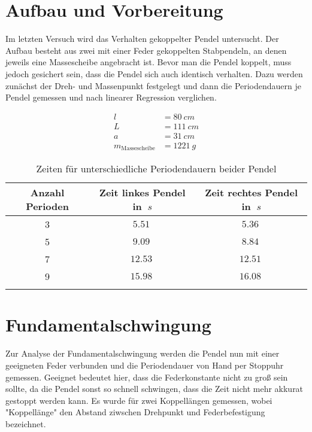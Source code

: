 \section{Aufbau und Vorbereitung}

Im letzten Versuch wird das Verhalten gekoppelter Pendel untersucht. Der Aufbau besteht aus zwei mit einer Feder gekoppelten Stabpendeln, an denen jeweils eine Massescheibe angebracht ist.
Bevor man die Pendel koppelt, muss jedoch gesichert sein, dass die Pendel sich auch identisch verhalten.
Dazu werden zunächst der Dreh- und Massenpunkt festgelegt und dann die Periodendauern je Pendel gemessen und nach linearer Regression verglichen.

\begin{align}
    l &= \SI{80}{cm} \\
    L &= \SI{111}{cm} \\
    a &= \SI{31}{cm} \\
    m_{\text{Massescheibe}} &= \SI{1221}{g}
\end{align}

\begin{table}[h!]
    \begin{center}
        \caption{Zeiten für unterschiedliche Periodendauern beider Pendel}
        \begin{tabular}{ccc}
            \hline
            Anzahl Perioden & Zeit linkes Pendel in $\SI{}{s}$ & Zeit rechtes Pendel in $\SI{}{s}$ \\
            \hline
            3  & $\SI{5,51}{}$ & $\SI{5,36}{}$ \\
            5  & $\SI{9,09}{}$ & $\SI{8,84}{}$  \\
            7  & $\SI{12,53}{}$ & $\SI{12,51}{}$  \\
            9  & $\SI{15,98}{}$ & $\SI{16,08}{}$ \\
            \hline
            \label{tab:Schwingungen-Pendel-einzeln}
        \end{tabular}
    \end{center}
\end{table}

\section{Fundamentalschwingung}

Zur Analyse der Fundamentalschwingung werden die Pendel nun mit einer geeigneten Feder verbunden und die Periodendauer von Hand per Stoppuhr gemessen.
Geeignet bedeutet hier, dass die Federkonstante nicht zu groß sein sollte, da die Pendel sonst so schnell schwingen, dass die Zeit nicht mehr akkurat gestoppt werden kann.
Es wurde für zwei Koppellängen gemessen, wobei "Koppellänge" den Abstand ziwschen Drehpunkt und Federbefestigung bezeichnet.


